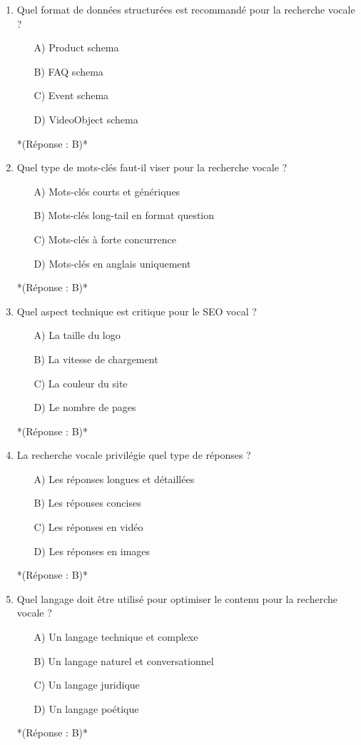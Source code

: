 \documentclass[12pt,a4paper,twoside]{report}
\begin{document}
\begin{enumerate}
    \item Quel format de données structurées est recommandé pour la recherche vocale ?
    \begin{itemize}
        \item[A)] Product schema
        \item[B)] FAQ schema
        \item[C)] Event schema
        \item[D)] VideoObject schema
    \end{itemize}
    *(Réponse : B)*

    \item Quel type de mots-clés faut-il viser pour la recherche vocale ?
    \begin{itemize}
        \item[A)] Mots-clés courts et génériques
        \item[B)] Mots-clés long-tail en format question
        \item[C)] Mots-clés à forte concurrence
        \item[D)] Mots-clés en anglais uniquement
    \end{itemize}
    *(Réponse : B)*

    \item Quel aspect technique est critique pour le SEO vocal ?
    \begin{itemize}
        \item[A)] La taille du logo
        \item[B)] La vitesse de chargement
        \item[C)] La couleur du site
        \item[D)] Le nombre de pages
    \end{itemize}
    *(Réponse : B)*

    \item La recherche vocale privilégie quel type de réponses ?
    \begin{itemize}
        \item[A)] Les réponses longues et détaillées
        \item[B)] Les réponses concises
        \item[C)] Les réponses en vidéo
        \item[D)] Les réponses en images
    \end{itemize}
    *(Réponse : B)*

    \item Quel langage doit être utilisé pour optimiser le contenu pour la recherche vocale ?
    \begin{itemize}
        \item[A)] Un langage technique et complexe
        \item[B)] Un langage naturel et conversationnel
        \item[C)] Un langage juridique
        \item[D)] Un langage poétique
    \end{itemize}
    *(Réponse : B)*


\end{enumerate}
\end{document}
